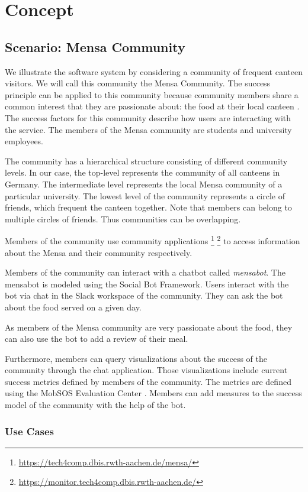 \chapter{Concept}\label{cha:concept}
\section{Scenario: Mensa Community}
We illustrate the software system by considering a community of frequent canteen visitors. We will call this community the Mensa Community.
The success principle can be applied to this community because community members share a common interest that they are passionate about: the food at their local canteen \cite{Kers20}.
The success factors for this community describe how users are interacting with the service. The members of the Mensa community are students and university employees.

The community has a hierarchical structure consisting of different community levels.
In our case, the top-level represents the community of all canteens in Germany.
The intermediate level represents the local Mensa community of a particular university.
The lowest level of the community represents a circle of friends, which frequent the canteen together. Note that members can belong to multiple circles of friends. Thus communities can be overlapping.

Members of the community use community applications \footnote{\url{https://tech4comp.dbis.rwth-aachen.de/mensa/}}
\footnote{\url{https://monitor.tech4comp.dbis.rwth-aachen.de/}} 
to access information about the Mensa and their community respectively.

Members of the community can interact with a chatbot called \emph{mensabot}. The mensabot is modeled using the Social Bot Framework. 
Users interact with the bot via chat in the Slack workspace of the community. They can ask the bot about the food served on a given day.

As members of the Mensa community are very passionate about the food, they can also use the bot to add a review of their meal.

Furthermore, members can query visualizations about the success of the community through the chat application. Those visualizations include current success metrics defined by members of the community. The metrics are defined using the MobSOS Evaluation Center \cite{Hoss19}. Members can add measures to the success model of the community with the help of the bot.

\subsection{Use Cases}

